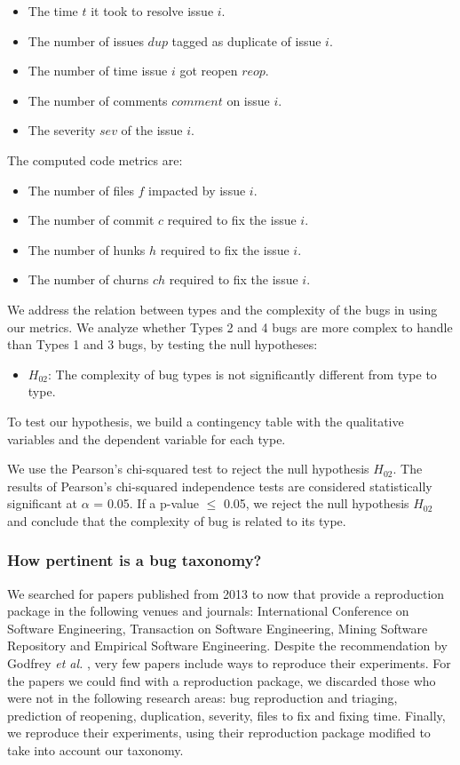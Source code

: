 \begin{itemize}
  \item The time $t$ it took to resolve issue $i$.
  \item The number of issues $dup$ tagged as duplicate of issue $i$.
  \item The number of time issue $i$ got reopen $reop$.
  \item The number of comments $comment$ on issue $i$.
  \item The severity $sev$ of the issue $i$.
\end{itemize}

The computed code metrics are:

\begin{itemize}
  \item The number of files $f$ impacted by issue $i$.
  \item The number of commit $c$ required to fix the issue $i$.
  \item The number of hunks $h$ required to fix the issue $i$.
  \item The number of churns $ch$ required to fix the issue $i$.
\end{itemize}


We address the relation between types and the complexity of the bugs in using our metrics.
We analyze whether Types 2 and 4 bugs are more complex to handle than Types 1 and 3 bugs, by testing the null hypotheses:

\begin{itemize}
 \item  $H_{02}$:  The complexity of bug types is not significantly different from type to type.
\end{itemize}

To test our hypothesis, we build a contingency table with the qualitative variables and the dependent variable for each type.

We use the Pearson's chi-squared test to reject the null hypothesis $H_{02}$.
The results of Pearson's chi-squared independence tests are considered statistically significant at $\alpha$ = 0.05.
If a p-value $\le$ 0.05, we reject the null hypothesis $H_{02}$ and conclude that the complexity of bug is related to its type.


\subsubsection{How pertinent is a bug taxonomy?}

We searched for papers published from 2013 to now that provide a reproduction package in the following venues and journals: International Conference on Software Engineering, Transaction on Software Engineering, Mining Software Repository and Empirical Software Engineering.
Despite the recommendation by Godfrey {\it et al.} \cite{Godfrey2009}, very few papers include ways to reproduce their experiments.
For the papers we could find with a reproduction package, we discarded those who were not in the following research areas: bug reproduction and triaging, prediction of reopening, duplication, severity, files to fix and fixing time.
Finally, we reproduce their experiments, using their reproduction package modified to take into account our taxonomy.
